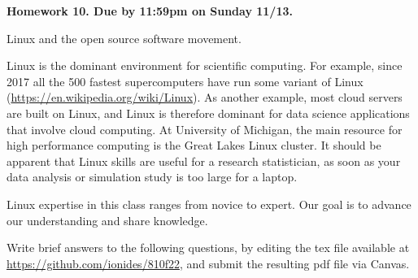 \documentclass[12pt]{article}
\begin{document}
\begin{center}\bf
Homework 10. Due by 11:59pm on Sunday 11/13.

Linux and the open source software movement.

\end{center}

Linux is the dominant environment for scientific computing. For example, since 2017 all the 500 fastest  supercomputers have run some variant of Linux (\url{https://en.wikipedia.org/wiki/Linux}). As another example, most cloud servers are built on Linux, and Linux is therefore dominant for data science applications that involve cloud computing. At University of Michigan, the main resource for high performance computing is the Great Lakes Linux cluster. It should be apparent that Linux skills are useful for a research statistician, as soon as your data analysis or simulation study is too large for a laptop.

Linux expertise in this class ranges from novice to expert. Our goal is to advance our understanding and share knowledge.

Write brief answers to the following questions, by editing the tex file available at \url{https://github.com/ionides/810f22}, and submit the resulting pdf file via Canvas.
\end{document}
